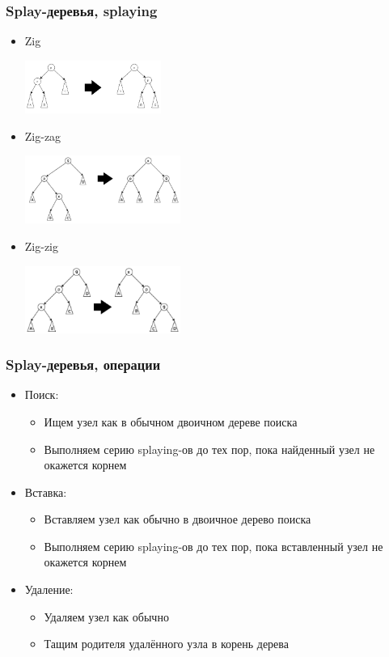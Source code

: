 \documentclass[xetex,mathserif,serif]{beamer}
\begin{document}
	\begin{frame}
		\frametitle{Splay-деревья, splaying}
		\begin{itemize}
			\item Zig
			\begin{center}
				\includegraphics[width=0.35\textwidth]{zig.png}
			\end{center}
			\item Zig-zag
			\begin{center}
				\includegraphics[width=0.4\textwidth]{zig-zag.png}
			\end{center}
			\item Zig-zig
			\begin{center}
				\includegraphics[width=0.4\textwidth]{zig-zig.png}
			\end{center}
		\end{itemize}
	\end{frame}

	\begin{frame}
		\frametitle{Splay-деревья, операции}
		\begin{itemize}
			\item Поиск:
			\begin{itemize}
				\item Ищем узел как в обычном двоичном дереве поиска
				\item Выполняем серию splaying-ов до тех пор, пока найденный узел не окажется корнем
			\end{itemize}
			\item Вставка:
			\begin{itemize}
				\item Вставляем узел как обычно в двоичное дерево поиска
				\item Выполняем серию splaying-ов до тех пор, пока вставленный узел не окажется корнем
			\end{itemize}
			\item Удаление:
			\begin{itemize}
				\item Удаляем узел как обычно
				\item Тащим родителя удалённого узла в корень дерева
			\end{itemize}
		\end{itemize}
	\end{frame}
\end{document}
